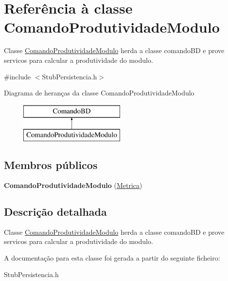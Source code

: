 \hypertarget{class_comando_produtividade_modulo}{
\section{\-Referência à classe \-Comando\-Produtividade\-Modulo}
\label{class_comando_produtividade_modulo}
}


\-Classe \hyperlink{class_comando_produtividade_modulo}{\-Comando\-Produtividade\-Modulo} herda a classe comando\-B\-D e prove servicos para calcular a produtividade do modulo.  




{\ttfamily \#include $<$\-Stub\-Persistencia.\-h$>$}

\-Diagrama de heranças da classe \-Comando\-Produtividade\-Modulo\begin{figure}[H]
\begin{center}
\leavevmode
\includegraphics[height=2.000000cm]{class_comando_produtividade_modulo}
\end{center}
\end{figure}
\subsection*{\-Membros públicos}
\begin{DoxyCompactItemize}
\item 
\hypertarget{class_comando_produtividade_modulo_a791ee6f93657e954df5948849ed7423d}{
{\bfseries \-Comando\-Produtividade\-Modulo} (\hyperlink{class_metrica}{\-Metrica})}
\label{class_comando_produtividade_modulo_a791ee6f93657e954df5948849ed7423d}

\end{DoxyCompactItemize}


\subsection{\-Descrição detalhada}
\-Classe \hyperlink{class_comando_produtividade_modulo}{\-Comando\-Produtividade\-Modulo} herda a classe comando\-B\-D e prove servicos para calcular a produtividade do modulo. 

\-A documentação para esta classe foi gerada a partir do seguinte ficheiro\-:\begin{DoxyCompactItemize}
\item 
\-Stub\-Persistencia.\-h\end{DoxyCompactItemize}
